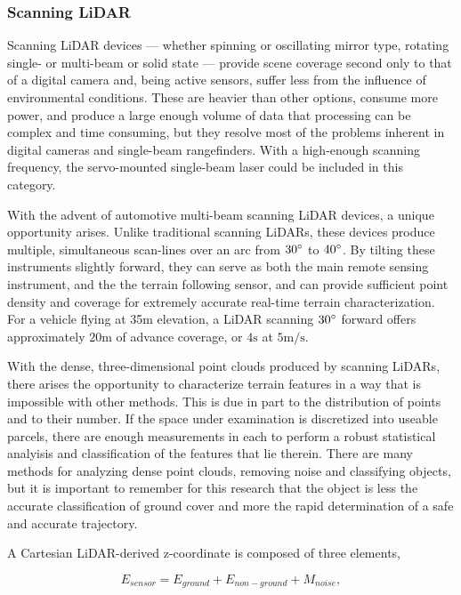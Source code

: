 \documentclass[10pt]{report}
\begin{document}
\subsubsection{Scanning LiDAR}

Scanning LiDAR devices --- whether spinning or oscillating mirror type, rotating single- or multi-beam or solid state --- provide scene coverage second only to that of a digital camera and, being active sensors, suffer less from the influence of environmental conditions. These are heavier than other options, consume more power, and produce a large enough volume of data that processing can be complex and time consuming, but they resolve most of the problems inherent in digital cameras and single-beam rangefinders. With a high-enough scanning frequency, the servo-mounted single-beam laser could be included in this category.

With the advent of automotive multi-beam scanning LiDAR devices, a unique opportunity arises. Unlike traditional scanning LiDARs, these devices produce multiple, simultaneous scan-lines over an arc from $30\degree$ to $40\degree$. By tilting these instruments slightly forward, they can serve as both the main remote sensing instrument, and the the terrain following sensor, and can provide sufficient point density and coverage for extremely accurate real-time terrain characterization. For a vehicle flying at 35m elevation, a LiDAR scanning $30\degree$ forward offers approximately $20\si{\m}$ of advance coverage, or $4\si{\s}$ at $5\si{\m\per\s}$. 

With the dense, three-dimensional point clouds produced by scanning LiDARs, there arises the opportunity to characterize terrain features in a way that is impossible with other methods. This is due in part to the distribution of points and to their number. If the space under examination is discretized into useable parcels, there are enough measurements in each to perform a robust statistical analyisis and classification of the features that lie therein. There are many methods for analyzing dense point clouds, removing noise and classifying objects, but it is important to remember for this research that the object is less the accurate classification of ground cover and more the rapid determination of a safe and accurate trajectory.

A Cartesian LiDAR-derived z-coordinate is composed of three elements, 

\begin{equation}
E_{sensor} = E_{ground} + E_{non-ground} + M_{noise},
\label{eq:decel}
\end{equation} 
\end{document}
